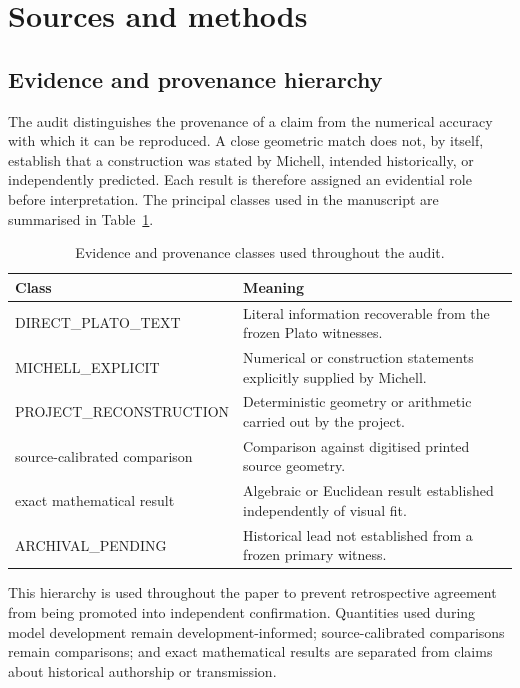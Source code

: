 \documentclass[11pt]{article}
\begin{document}
\section{Sources and methods}

\subsection{Evidence and provenance hierarchy}

The audit distinguishes the provenance of a claim from the numerical accuracy
with which it can be reproduced.  A close geometric match does not, by itself,
establish that a construction was stated by Michell, intended historically, or
independently predicted.  Each result is therefore assigned an evidential role
before interpretation.  The principal classes used in the manuscript are
summarised in Table~\ref{tab:provenance}.

\begin{table}[ht]
\centering
\caption{Evidence and provenance classes used throughout the audit.}%
\label{tab:provenance}
\begin{tabularx}{\linewidth}{>{\ttfamily}l X}
\toprule
Class & Meaning \\
\midrule
DIRECT\_PLATO\_TEXT &
Literal information recoverable from the frozen Plato witnesses. \\
MICHELL\_EXPLICIT &
Numerical or construction statements explicitly supplied by Michell. \\
PROJECT\_RECONSTRUCTION &
Deterministic geometry or arithmetic carried out by the project. \\
source-calibrated comparison &
Comparison against digitised printed source geometry. \\
exact mathematical result &
Algebraic or Euclidean result established independently of visual fit. \\
ARCHIVAL\_PENDING &
Historical lead not established from a frozen primary witness. \\
\bottomrule
\end{tabularx}
\end{table}

This hierarchy is used throughout the paper to prevent retrospective
agreement from being promoted into independent confirmation.  Quantities used
during model development remain development-informed; source-calibrated
comparisons remain comparisons; and exact mathematical results are separated
from claims about historical authorship or transmission.
\end{document}
